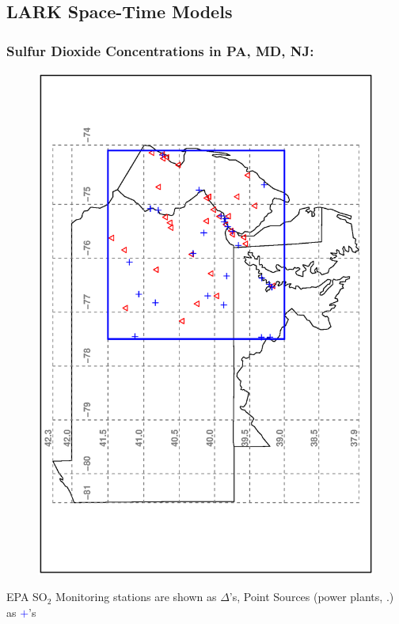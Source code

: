 \documentclass[dvips]{beamer}
\newcommand{\bs}[2]{\begin{frame} \frametitle{#1} 
{#2}
\end{frame} }
\newcommand{\blue}{\textcolor{Blue}}
\newcommand{\red}{\textcolor{RedOrange}}
\begin{document}
\subsection{LARK Space-Time Models}
\bs{Sulfur Dioxide Concentrations in PA, MD, NJ:} {
\vspace{-8mm}
\begin{figure}[!h]
  \begin{center}
    \includegraphics[angle=270,origin=l, clip=1,
     totalheight=6truecm]{SO2-rlw.ps}
  \end{center}
\end{figure}
\vspace{-5mm}
EPA SO${_2}$ Monitoring stations  are shown as \red{$\Delta$}'s,
Point Sources (power plants, \etc.) as \blue{$+$}'s
}
\end{document}
